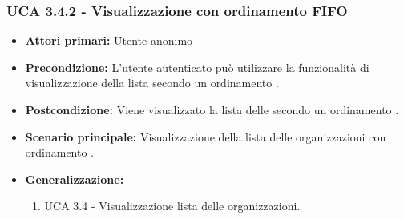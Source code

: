 \subsubsection{UCA 3.4.2 - Visualizzazione con ordinamento FIFO}%
\begin{itemize}	
	\item \textbf{Attori primari:} Utente anonimo
	\item \textbf{Precondizione:} L'utente autenticato può utilizzare la funzionalità di visualizzazione della lista secondo un ordinamento .
	\item \textbf{Postcondizione:} Viene visualizzato la lista delle  secondo un ordinamento .
	\item \textbf{Scenario principale:} Visualizzazione della lista delle organizzazioni con ordinamento .
	\item \textbf{Generalizzazione:}
	\begin{enumerate}
		\item UCA 3.4 - Visualizzazione lista delle organizzazioni.
	\end{enumerate}	
\end{itemize}

\newpage

